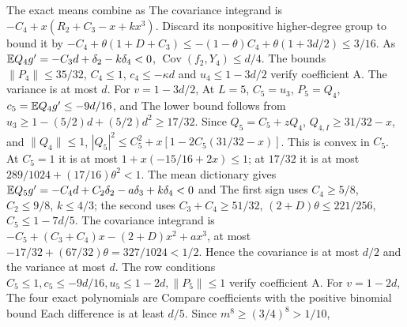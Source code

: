 The exact means combine as
The covariance integrand is $-C_4+x(R_2+C_3-x+kx^3)$.
Discard its nonpositive higher-degree group to bound it by
$-C_4+\theta(1+D+C_3)
\le-(1-\theta)C_4+\theta(1+3d/2)\le3/16$.
As $\mathbb E Q_4g'=\allowbreak -C_3d+\delta_2-k\delta_4<\allowbreak 0$,
$\operatorname{Cov}(f_2,\allowbreak Y_4)\le\allowbreak  d/4$.
The bounds $\|P_4\|\le\allowbreak 35/32$, $C_4\le\allowbreak 1$, $c_4\le\allowbreak -\kappa d$ and
$u_4\le\allowbreak 1-3d/2$ verify coefficient A.
The variance is at most $d$. For $v=\allowbreak 1-3d/2$,
At $L=\allowbreak 5$, $C_5=\allowbreak u_3$, $P_5=\allowbreak Q_4$, $c_5=\allowbreak \mathbb E Q_4g'\le\allowbreak -9d/16$, and
The lower bound follows from
$u_3\ge\allowbreak 1-(5/2)d+(5/2)d^2\ge\allowbreak 17/32$.
Since $Q_5=\allowbreak C_5+zQ_4$, $Q_{4,\allowbreak I}\ge\allowbreak 31/32-x$, and $\|Q_4\|\le\allowbreak 1$,
$|Q_5|^2\le\allowbreak  C_5^2+x[1-2C_5(31/32-x)]$.
This is convex in $C_5$. At $C_5=\allowbreak 1$ it is at most
$1+x(-15/16+2x)\le\allowbreak 1$; at $17/32$ it is at most
$289/1024+(17/16)\theta^2<\allowbreak 1$.
The mean dictionary gives $\mathbb E Q_5g'=\allowbreak -C_4d+C_2\delta_2-a\delta_3+k\delta_4<\allowbreak 0$ and
The first sign uses $C_4\ge\allowbreak 5/8$, $C_2\le\allowbreak 9/8$, $k\le\allowbreak 4/3$;
the second uses $C_3+C_4\ge\allowbreak 51/32$, $(2+D)\theta\le\allowbreak 221/256$,
$C_5\le\allowbreak 1-7d/5$.
The covariance integrand is
$-C_5+(C_3+C_4)x-(2+D)x^2+ax^3$, at most
$-17/32+(67/32)\theta=\allowbreak 327/1024<\allowbreak 1/2$.
Hence the covariance is at most $d/2$ and the variance at most $d$.
The row conditions $C_5\le\allowbreak 1,\allowbreak c_5\le\allowbreak -9d/16,\allowbreak u_5\le\allowbreak 1-2d,\allowbreak \|P_5\|\le\allowbreak 1$
verify coefficient A. For $v=\allowbreak 1-2d$,
The four exact polynomials are
Compare coefficients with the positive binomial bound
Each difference is at least $d/5$.
Since $m^8\ge\allowbreak (3/4)^8>\allowbreak 1/10$,

